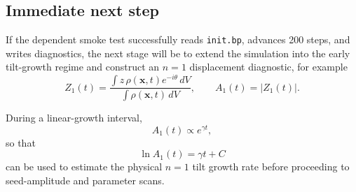 \documentclass[11pt,a4paper]{article}
\begin{document}
\subsection{Immediate next step}

If the dependent smoke test successfully reads \texttt{init.bp}, advances
200 steps, and writes diagnostics, the next stage will be to extend the
simulation into the early tilt-growth regime and construct an $n=1$
displacement diagnostic, for example
\[
Z_1(t)
=
\frac{
\displaystyle
\int z\,\rho(\mathbf{x},t)e^{-i\theta}\,dV
}{
\displaystyle
\int \rho(\mathbf{x},t)\,dV
},
\qquad
A_1(t)=|Z_1(t)|.
\]

During a linear-growth interval,
\[
A_1(t)\propto e^{\gamma t},
\]
so that
\[
\ln A_1(t)=\gamma t+C
\]
can be used to estimate the physical $n=1$ tilt growth rate before proceeding
to seed-amplitude and parameter scans.
\end{document}
